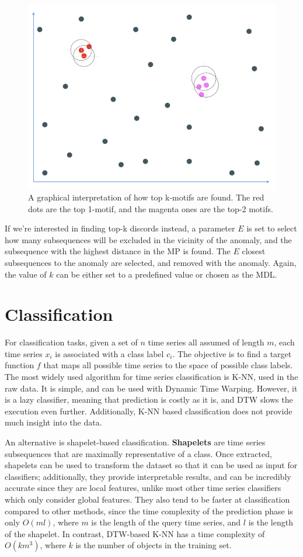 \begin{figure}[h]
    \centering
    \includegraphics[width=0.5\linewidth]{img/topk_motifs.png}
    \caption{A graphical interpretation of how top k-motifs are found. The red dots are the top 1-motif, and the magenta ones are the top-2 motifs.}
    \label{fig:top-k-motifs}
\end{figure}

If we're interested in finding top-k discords instead, a parameter $E$ is set to select how many subsequences will be excluded in the vicinity of the anomaly, and the subsequence with the highest distance in the MP is found. The $E$ closest subsequences to the anomaly are selected, and removed with the anomaly. Again, the value of $k$ can be either set to a predefined value or chosen as the MDL.

\section{Classification}

For classification tasks, given a set of $n$ time series all assumed of length $m$, each time series $x_i$ is associated with a class label $c_i$. The objective is to find a target function $f$ that maps all possible time series to the space of possible class labels. The most widely used algorithm for time series classification is K-NN, used in the raw data. It is simple, and can be used with Dynamic Time Warping. However, it is a lazy classifier, meaning that prediction is costly as it is, and DTW slows the execution even further. Additionally, K-NN based classification does not provide much insight into the data.

An alternative is shapelet-based classification. \textbf{Shapelets} are time series subsequences that are maximally representative of a class. Once extracted, shapelets can be used to transform the dataset so that it can be used as input for classifiers; additionally, they provide interpretable results, and can be incredibly accurate since they are local features, unlike most other time series classifiers which only consider global features. They also tend to be faster at classification compared to other methods, since the time complexity of the prediction phase is only $O(ml)$, where $m$ is the length of the query time series, and $l$ is the length of the shapelet. In contrast, DTW-based K-NN has a time complexity of $O(km^3)$, where $k$ is the number of objects in the training set.

